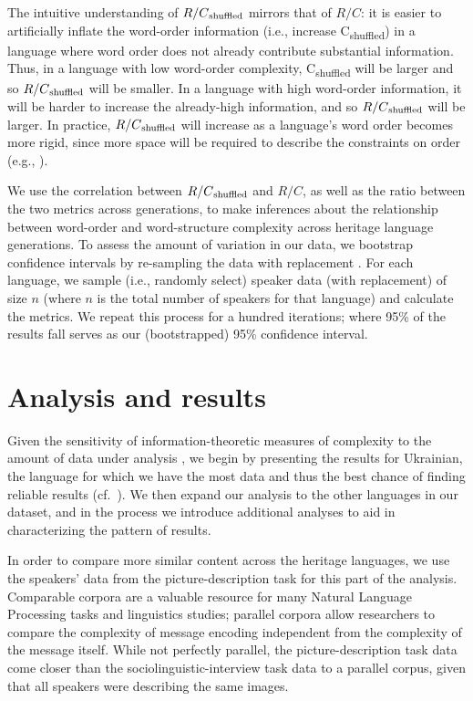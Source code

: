 \documentclass[output=paper]{langscibook}
\begin{document}
The intuitive understanding of $R/C\textsubscript{shuffled}$ mirrors that of $R/C$: it is easier to artificially inflate the word-order information (i.e., increase C\textsubscript{shuffled}) in a language where word order does not already contribute substantial information. Thus, in a language with low word-order complexity, C\textsubscript{shuffled} will be larger and so $R/C\textsubscript{shuffled}$ will be smaller. In a language with high word-order information, it will be harder to increase the already-high information, and so $R/C\textsubscript{shuffled}$ will be larger. In practice, $R/C\textsubscript{shuffled}$ will increase as a language's word order becomes more rigid, since more space will be required to describe the constraints on order (e.g., \citealp{ehretszmrecsanyi2019}).

We use the correlation between  $R/C\textsubscript{shuffled}$ and $R/C$, as well as the ratio between the two metrics across generations, to make inferences about the relationship between word-order and word-structure complexity across heritage language generations. To assess the amount of variation in our data, we bootstrap confidence intervals by re-sampling the data with replacement \citep{singh2008bootstrap}. For each language, we sample (i.e., randomly select) speaker data (with replacement) of size $n$ (where $n$ is the total number of speakers for that language) and calculate the metrics. We repeat this process for a hundred iterations; where 95\% of the results fall serves as our (bootstrapped) 95\% confidence interval.


\section{Analysis and results} \label{results}

Given the sensitivity of information-theoretic measures of complexity to the amount of data under analysis \citep[e.g.,][]{ehretszmrecsanyi2019}, we begin by presenting the results for Ukrainian, the language for which we have the most data and thus the best chance of finding reliable results (cf.~). We then expand our analysis to the other languages in our dataset, and in the process we introduce additional analyses to aid in characterizing the pattern of results.

In order to compare more similar content across the heritage languages, we use the speakers' data from the picture-description task for this part of the analysis. Comparable corpora are a valuable resource for many Natural Language Processing tasks and linguistics studies; parallel corpora allow researchers to compare the complexity of message encoding independent from the complexity of the message itself. While not perfectly parallel, the picture-description task data come closer than the sociolinguistic-interview task data to a parallel corpus, given that all speakers were describing the same images. 
\end{document}
